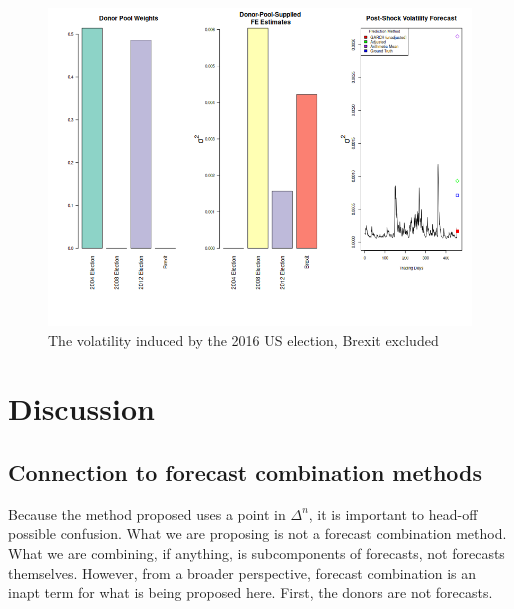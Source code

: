 \documentclass[11pt]{article}
\theoremstyle{definition}
\begin{document}
\begin{figure}[h!]
\begin{center}
  \includegraphics[scale=.6]{real_data_output_plots/savetime_WedJan1010:53:23PM2024_IYG_CL=F-^VIX-^IRX-^FVX-^TNX-^TYX_^VIX_2016-11-08-2004-11-02-2008-11-04-2012-11-06-2016-06-23.png}
  \caption{The volatility induced by the 2016 US election, Brexit excluded}
  \label{fig:SVF_2016_without_Brexit}
  \end{center}
\end{figure}

\section{Discussion}
\subsection{Connection to forecast combination methods}
Because the method proposed uses a point in $\Delta^{n}$, it is important to head-off possible confusion.  What we are proposing is not a forecast combination method.  What we are combining, if anything, is subcomponents of forecasts, not forecasts themselves.  However, from a broader perspective, forecast combination is an inapt term for what is being proposed here.  First, the donors are not forecasts. 
\end{document}
